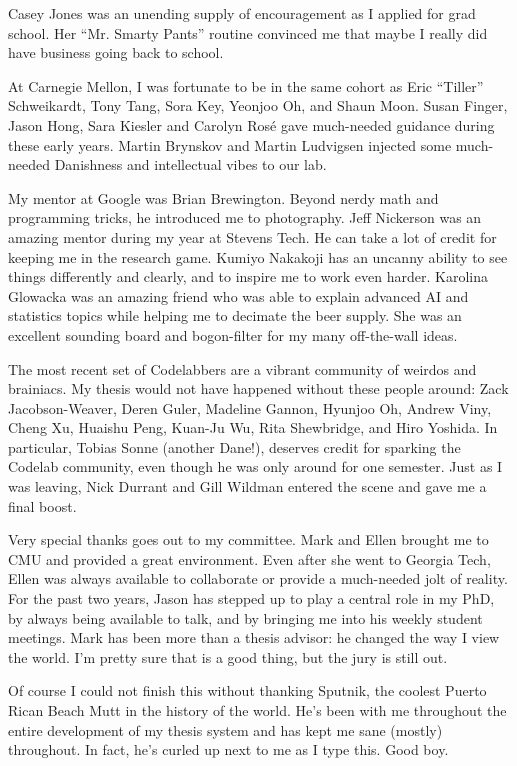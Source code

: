 Casey Jones was an unending supply of encouragement as I applied for
grad school. Her ``Mr. Smarty Pants'' routine convinced me that maybe
I really did have business going back to school.

At Carnegie Mellon, I was fortunate to be in the same cohort as Eric
``Tiller'' Schweikardt, Tony Tang, Sora Key, Yeonjoo Oh, and Shaun
Moon. Susan Finger, Jason Hong, Sara Kiesler and Carolyn Ros\'e gave
much-needed guidance during these early years. Martin Brynskov and
Martin Ludvigsen injected some much-needed Danishness and intellectual
vibes to our lab.

My mentor at Google was Brian Brewington. Beyond nerdy math and
programming tricks, he introduced me to photography.  Jeff Nickerson
was an amazing mentor during my year at Stevens Tech. He can take a
lot of credit for keeping me in the research game. Kumiyo Nakakoji has
an uncanny ability to see things differently and clearly, and to
inspire me to work even harder. Karolina Glowacka was an amazing
friend who was able to explain advanced AI and statistics topics while
helping me to decimate the beer supply. She was an excellent sounding
board and bogon-filter for my many off-the-wall ideas.

The most recent set of Codelabbers are a vibrant community of weirdos
and brainiacs. My thesis would not have happened without these people
around: Zack Jacobson-Weaver, Deren Guler, Madeline Gannon, Hyunjoo
Oh, Andrew Viny, Cheng Xu, Huaishu Peng, Kuan-Ju Wu, Rita Shewbridge,
and Hiro Yoshida. In particular, Tobias Sonne (another Dane!),
deserves credit for sparking the Codelab community, even though he was
only around for one semester. Just as I was leaving, Nick Durrant and
Gill Wildman entered the scene and gave me a final boost.

Very special thanks goes out to my committee. Mark and Ellen brought
me to CMU and provided a great environment. Even after she went to
Georgia Tech, Ellen was always available to collaborate or provide a
much-needed jolt of reality. For the past two years, Jason has stepped
up to play a central role in my PhD, by always being available to
talk, and by bringing me into his weekly student meetings. Mark has
been more than a thesis advisor: he changed the way I view the
world. I'm pretty sure that is a good thing, but the jury is still
out.

Of course I could not finish this without thanking Sputnik, the
coolest Puerto Rican Beach Mutt in the history of the world. He's been
with me throughout the entire development of my thesis system and has
kept me sane (mostly) throughout. In fact, he's curled up next to me
as I type this. Good boy.
